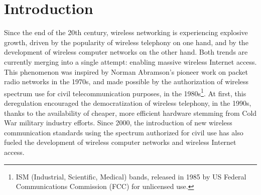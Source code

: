 \section{Introduction}
%
Since the end of the 20th century, wireless networking is experiencing explosive growth, driven by the popularity of wireless telephony on one hand, and by the development of wireless computer networks on the other hand. Both trends are currently merging into a single attempt: enabling massive wireless Internet access. This phenomenon was inspired by Norman Abramson's pioneer work on packet radio networks \cite{ABRAMSON-70} in the 1970s, and made possible by the authorization of wireless spectrum use for civil telecommunication purposes, in the 1980s\footnote{ISM (Industrial, Scientific, Medical) bands, released in 1985 by US Federal Communications Commission (FCC) for unlicensed use.}. At first, this deregulation encouraged the democratization of wireless telephony, in the 1990s, thanks to the availability of cheaper, more efficient hardware stemming from Cold War military industry efforts. Since 2000, the introduction of new wireless communication standards using the spectrum authorized for civil use has also fueled the development of wireless computer networks and wireless Internet access.
%

